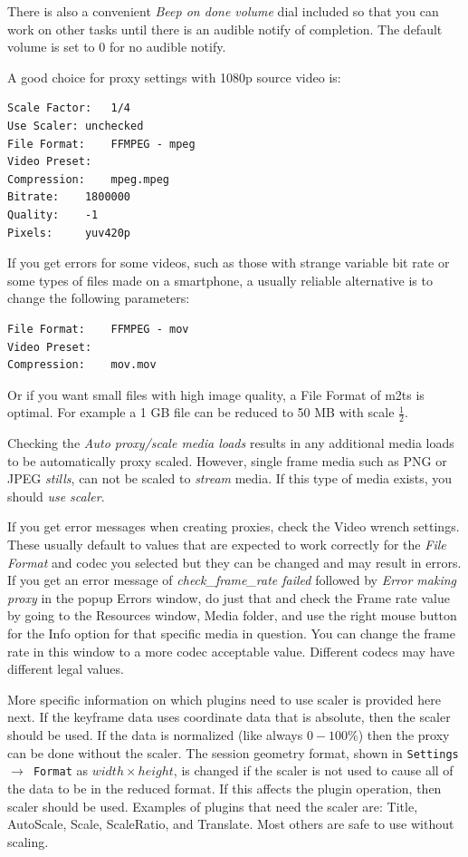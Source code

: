 There is also a convenient \textit{Beep on done volume} dial included so that you can work on other tasks until there is an audible notify of completion.  The default volume is set to 0 for no audible notify.

A good choice for proxy settings with 1080p source video is:

\begin{lstlisting}[numbers=none]
Scale Factor: 	1/4
Use Scaler:	unchecked
File Format:	FFMPEG - mpeg
Video Preset:
Compression:	mpeg.mpeg
Bitrate:	1800000
Quality:	-1
Pixels:		yuv420p
\end{lstlisting}

If you get errors for some videos, such as those with strange variable bit rate or some types of files made on a smartphone, a usually reliable alternative is to change the following parameters:

\begin{lstlisting}[numbers=none]
File Format:	FFMPEG - mov
Video Preset:
Compression:	mov.mov
\end{lstlisting}

Or if you want small files with high image quality, a File Format of m2ts is optimal.  For example a 1 GB file can be reduced to 50 MB with scale $\frac{1}{2}$. 

Checking the \textit{Auto proxy/scale media loads} results in any additional media loads to be automatically proxy scaled.  However, single frame media such as PNG or JPEG \textit{stills}, can not be scaled to \textit{stream} media.  If this type of media exists, you should \textit{use scaler}.

If you get error messages when creating proxies, check the Video wrench settings.  These usually default to values that are expected to work correctly for the \textit{File Format} and codec you selected but they can be changed and may result in errors.  If you get an error message of \textit{check\_frame\_rate failed} followed by \textit{Error making proxy} in the popup Errors window, do just that and check the Frame rate value by going to the Resources window, Media folder, and use the right mouse button for the Info option for that specific media in question.  You can change the frame rate in this window to a more codec acceptable value.  Different codecs may have different legal values.

More specific information on which plugins need to use scaler is provided here next.  If the keyframe data uses coordinate data that is absolute, then the scaler should be used.  If the data is normalized (like always $0-100\%$) then the proxy can be done without the scaler.  The session geometry format, shown in \texttt{Settings $\rightarrow$ Format} as $width \times height$, is changed if the scaler is not used to cause all of the data to be in the reduced format.  If this affects the plugin operation, then scaler should be used.  Examples of plugins that need the scaler are: Title, AutoScale, Scale, ScaleRatio, and Translate.  Most others are safe to use without scaling.

